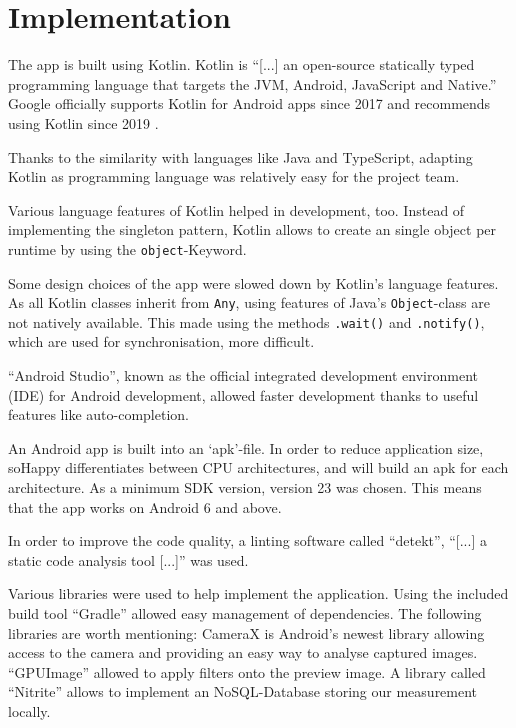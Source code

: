 \section{Implementation} \label{sec:implementation}

The app is built using Kotlin. Kotlin is ``[...] an open-source statically 
typed programming language that targets the JVM, Android, JavaScript and 
Native.'' \cite{kotlin2020}
Google officially supports Kotlin for Android apps since 2017
\cite{googleio2017} and recommends using Kotlin since 2019
\cite{androidkotlin2019}.

Thanks to the similarity with languages like Java and TypeScript, adapting
Kotlin as programming language was relatively easy for the project team.

Various language features of Kotlin helped in development, too. Instead of
implementing the singleton pattern, Kotlin allows to create an single object
per runtime by using the \texttt{object}-Keyword.

Some design choices of the app were slowed down by Kotlin's language features.
As all Kotlin classes inherit from \texttt{Any}, using features of Java's 
\texttt{Object}-class are not natively available. This made using the methods
\texttt{.wait()} and \texttt{.notify()}, which are used for synchronisation,
more difficult.

``Android Studio'', known as the official integrated development environment 
(IDE) for Android development, allowed faster development thanks to useful
features like auto-completion. 

An Android app is built into an `apk'-file. In order to reduce application
size, soHappy differentiates between CPU architectures, and will
build an apk for each architecture. As a minimum SDK version, version 23
was chosen. This means that the app works on Android 6 and above.

In order to improve the code quality, a linting software called ``detekt'',
``[...] a static code analysis tool [...]''\cite{detekt2020} was used.

Various libraries were used to help implement the application. Using
the included build tool ``Gradle'' \cite{gradle} allowed easy management of 
dependencies. The following libraries are worth mentioning: CameraX 
\cite{camerax} is Android's newest library allowing access to the camera and 
providing an easy way to analyse captured images. ``GPUImage'' \cite{gpuimage}
allowed to apply filters onto the preview image. A library called ``Nitrite''
\cite{nitrite} allows to implement an NoSQL-Database storing our measurement 
locally.

